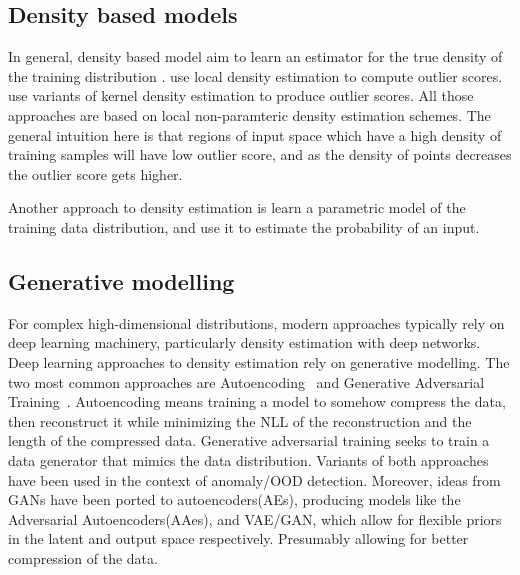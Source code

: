 \documentclass[../main.tex]{subfiles}
\begin{document}
\subsection{Density based models}

In general, density based model aim to learn an estimator for the true density of the training distribution . 
\citep{breunig2000lof, zhang2009new} use local density estimation to compute outlier scores. \citep{qin2016kelos, he2004novelty, bishop1994novelty} use variants of kernel density estimation to produce outlier scores. All those approaches are based on local non-paramteric density estimation schemes. The general intuition here is that regions of input space which have a high density of training samples will have low outlier score, and as the density of points decreases the outlier score gets higher. 

Another approach to density estimation is learn a parametric model of the training data distribution, and use it to estimate the probability of an input. 


\subsection{Generative modelling}

For complex high-dimensional distributions, modern approaches typically rely on deep learning machinery, particularly density estimation with deep networks. Deep learning approaches to density estimation rely on generative modelling. The two most common approaches are Autoencoding~\cite{kingma2013auto} and Generative Adversarial Training~\cite{goodfellow2014generative}. Autoencoding means training a model to somehow compress the data, then reconstruct it while minimizing the NLL of the reconstruction and the length of the compressed data.
Generative adversarial training seeks to train a data generator that mimics the data distribution. Variants of both approaches have been used in the context of anomaly/OOD detection. Moreover, ideas from GANs have been ported to autoencoders(AEs), producing models like the Adversarial Autoencoders(AAes)\citep{makhzani2015adversarial}, and VAE/GAN\citep{larsen2015autoencoding}, which allow for flexible priors in the latent and output space respectively. Presumably allowing for better compression of the data.
\end{document}
